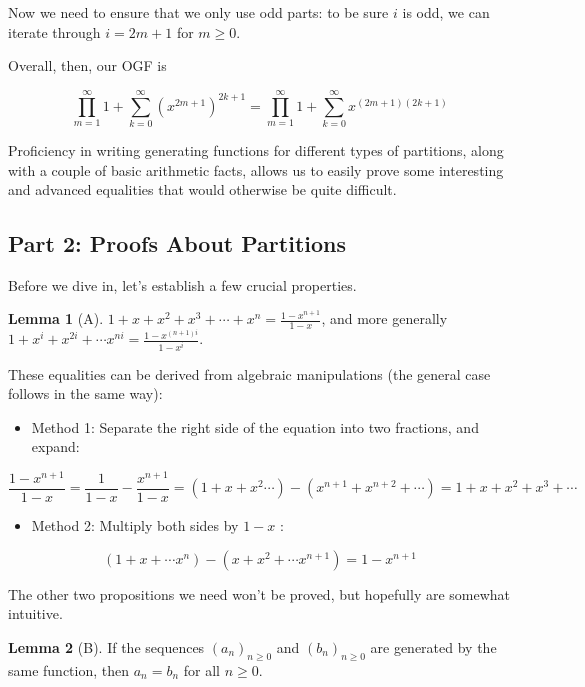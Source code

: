 \documentclass{article}
\theoremstyle{definition}
\newtheorem{lemma}{Lemma}
\begin{document}
Now we need to ensure that we only use odd parts: to be sure $i$ is odd, we can iterate through $i=2 m+1$ for $m \geq 0$.

Overall, then, our OGF is

$$
\prod_{m=1}^{\infty} 1+\sum_{k=0}^{\infty}\left(x^{2 m+1}\right)^{2 k+1}=\prod_{m=1}^{\infty} 1+\sum_{k=0}^{\infty} x^{(2 m+1)(2 k+1)}
$$

Proficiency in writing generating functions for different types of partitions, along with a couple of basic arithmetic facts, allows us to easily prove some interesting and advanced equalities that would otherwise be quite difficult.

\subsection*{Part 2: Proofs About Partitions}
Before we dive in, let's establish a few crucial properties.\\
\begin{lemma}[A]
$1+x+x^{2}+x^{3}+\cdots+x^{n}=\frac{1-x^{n+1}}{1-x}$, and more generally $1+x^{i}+x^{2 i}+\cdots x^{n i}=\frac{1-x^{(n+1) i}}{1-x^{i}}$.
\end{lemma}

These equalities can be derived from algebraic manipulations (the general case follows in the same way):

\begin{itemize}
  \item Method 1: Separate the right side of the equation into two fractions, and expand:
\end{itemize}

$$
\frac{1-x^{n+1}}{1-x}=\frac{1}{1-x}-\frac{x^{n+1}}{1-x}=\left(1+x+x^{2} \cdots\right)-\left(x^{n+1}+x^{n+2}+\cdots\right)=1+x+x^{2}+x^{3}+\cdots
$$

\begin{itemize}
  \item Method 2: Multiply both sides by $1-x$ :
\end{itemize}

$$
\left(1+x+\cdots x^{n}\right)-\left(x+x^{2}+\cdots x^{n+1}\right)=1-x^{n+1}
$$

The other two propositions we need won't be proved, but hopefully are somewhat intuitive.\\
\begin{lemma}[B]
If the sequences $\left(a_{n}\right)_{n \geq 0}$ and $\left(b_{n}\right)_{n \geq 0}$ are generated by the same function, then $a_{n}=b_{n}$ for all $n \geq 0$.
\end{lemma}
\end{document}
